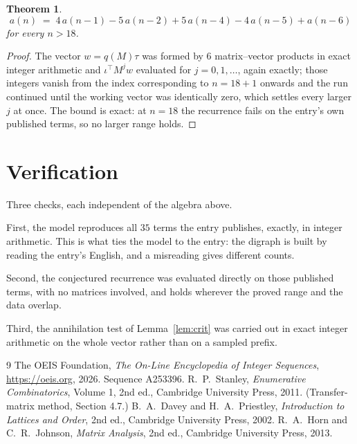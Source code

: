 \documentclass[11pt,a4paper]{article}
\theoremstyle{plain}
\newtheorem{theorem}{Theorem}
\theoremstyle{definition}
\begin{document}
\begin{theorem}
\[
a(n)\;=\;4\,a(n-1) - 5\,a(n-2) + 5\,a(n-4) - 4\,a(n-5) + a(n-6)
\]
for every $n>18$.
\end{theorem}

\begin{proof}
The vector $w=q(M)\tau$ was formed by $6$ matrix--vector products in exact integer
arithmetic and $\iota^{\!\top}M^{j}w$ evaluated for $j=0,1,\dots$, again exactly; those
integers vanish from the index corresponding to $n=18+1$ onwards and the run continued
until the working vector was identically zero, which settles every larger $j$ at once. The bound is exact: at $n=18$ the recurrence fails on the entry's own published terms, so no larger range holds.
\end{proof}

\section{Verification}

Three checks, each independent of the algebra above.

First, the model reproduces all $35$ terms the entry publishes, exactly, in integer
arithmetic. This is what ties the model to the entry: the digraph is built by reading the
entry's English, and a misreading gives different counts.

Second, the conjectured recurrence was evaluated directly on those published terms, with no
matrices involved, and holds wherever the proved range and the data overlap.

Third, the annihilation test of Lemma~\ref{lem:crit} was carried out in exact integer
arithmetic on the whole vector rather than on a sampled prefix.

\begin{thebibliography}{9}
 The OEIS Foundation, \emph{The On-Line Encyclopedia of Integer
Sequences}, \url{https://oeis.org}, 2026. Sequence A253396.
 R.~P.~Stanley, \emph{Enumerative Combinatorics}, Volume 1, 2nd ed.,
Cambridge University Press, 2011. (Transfer-matrix method, Section 4.7.)
 B.~A.~Davey and H.~A.~Priestley, \emph{Introduction to Lattices and
Order}, 2nd ed., Cambridge University Press, 2002.
 R.~A.~Horn and C.~R.~Johnson, \emph{Matrix Analysis}, 2nd ed., Cambridge
University Press, 2013.
\end{thebibliography}
\end{document}
